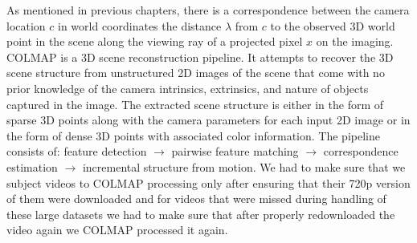 
As mentioned in previous chapters, there is a correspondence between the camera location $c$ in world coordinates the distance $\lambda$ from $c$ to the observed 3D world point in the scene along the viewing ray of a projected pixel $x$ on the imaging. COLMAP is a 3D scene reconstruction pipeline. It attempts to recover the 3D scene structure from unstructured 2D images of the scene that come with no prior knowledge of the camera intrinsics, extrinsics, and nature of objects captured in the image. The extracted scene structure is either in the form of sparse 3D points along with the camera parameters for each input 2D image or in the form of dense 3D points with associated color information. The pipeline consists of: feature detection $\rightarrow$ pairwise feature matching  $\rightarrow$ correspondence estimation $\rightarrow$ incremental structure from motion. We had to make sure that we subject videos to COLMAP processing only after ensuring that their 720p version of them were downloaded and for videos that were missed during handling of these large datasets we had to make sure that after properly redownloaded the video again we COLMAP processed it again.






















